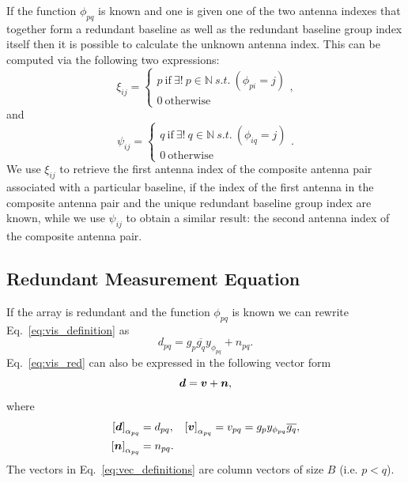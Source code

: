 \documentclass[useAMS,usenatbib]{mn2e}
\newcommand{\bd}{\bmath{d}}
\newcommand{\bv}{\bmath{v}}
\newcommand{\bn}{\bmath{n}}
\newcommand{\conj}[1]{\overline{#1}}
\begin{document}
If the function $\phi_{pq}$ is known and one is given one of the two antenna indexes that together form a redundant baseline as well as the redundant baseline group index itself then it is possible 
to calculate the unknown antenna index. This can be computed via the following two expressions:
\begin{equation}
\xi_{ij} = 
\begin{cases}
p~\textrm{if}~\exists! ~ p \in \mathbb{N} ~ s.t. ~(\phi_{pi} = j)\\
0~\textrm{otherwise}
\end{cases},
\end{equation}
and
\begin{equation}
\psi_{ij} = 
\begin{cases}
q~\textrm{if}~\exists! ~ q \in \mathbb{N} ~ s.t. ~(\phi_{iq} = j)\\
0~\textrm{otherwise}
\end{cases}.
\end{equation}
We use $\xi_{ij}$ to retrieve the first antenna index of the composite antenna pair associated with a particular baseline, if the index of the first antenna in the composite antenna pair and the unique redundant baseline group index are known, while we use $\psi_{ij}$ to obtain 
a similar result: the second antenna index of the composite antenna pair. %

\subsection{Redundant Measurement Equation}
\label{sec:r_mes}
If the array is redundant and the function $\phi_{pq}$ is known we can rewrite Eq.~\eqref{eq:vis_definition} as
\begin{equation}
\label{eq:vis_red}
d_{pq} = g_{p}\conj{g_q}y_{\phi_{pq}} + n_{pq}.
\end{equation}
Eq.~\eqref{eq:vis_red} can also be expressed in the following vector form 
\begin{equation}
\label{eq:vis_red_vec}
\bd = \bv + \bn, 
\end{equation}
where 
\begin{align}
 \left [ \bd \right]_{\alpha_{pq}} &= d_{pq}, & \left [ \bv \right ]_{\alpha_{pq}} &= v_{pq}=g_p y_{\phi_{pq}} \conj{g_q},\nonumber\\
 \left [ \bn \right ]_{\alpha_{pq}} &= n_{pq}. &  &\label{eq:vec_definitions}
\end{align}
The vectors in Eq.~\eqref{eq:vec_definitions} are column vectors of size $B$ (i.e. $p<q$).
\end{document}
